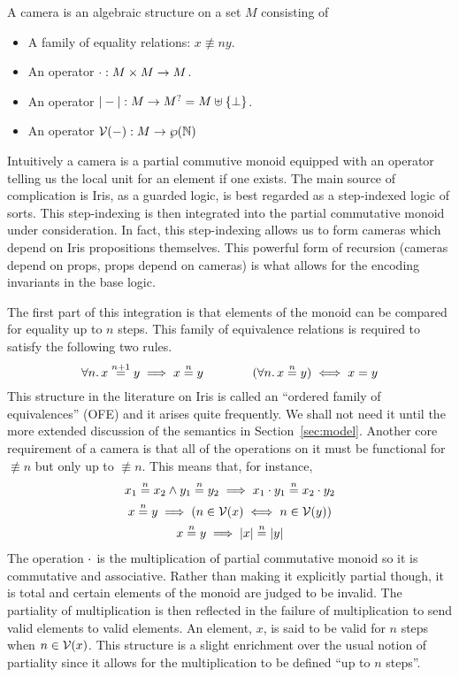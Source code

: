 \documentclass{amsart}
\begin{document}
A camera is an algebraic structure on a set $M$ consisting of
\begin{itemize}
\item A family of equality relations: $x \nequiv{n} y$.
\item An operator $\mathbin{\cdot} : M \times M \to M$.
\item An operator ${\mid}-{\mid} : M \to M^? = M \uplus \{\bot\}$.
\item An operator $\mathcal{V}(-) : M \to \wp(\mathbb{N})$
\end{itemize}
Intuitively a camera is a partial commutive monoid equipped with an
operator telling us the local unit for an element if one exists. The
main source of complication is Iris, as a guarded logic, is best
regarded as a step-indexed logic of sorts. This step-indexing is then
integrated into the partial commutative monoid under
consideration. In fact, this step-indexing allows us to form cameras
which depend on Iris propositions themselves. This powerful form of
recursion (cameras depend on props, props depend on cameras) is what
allows for the encoding invariants in the base logic.

The first part of this integration is that elements of the monoid can
be compared for equality up to $n$ steps. This family of equivalence
relations is required to satisfy the following two rules.
\[
  \All n. x \nequiv{n + 1} y \implies x \nequiv{n} y \qquad\qquad
  (\All n. x \nequiv{n} y) \iff x = y
\]
This structure in the literature on Iris is called an ``ordered family
of equivalences'' (OFE) and it arises quite frequently. We shall not
need it until the more extended discussion of the semantics in
Section~\ref{sec:model}. Another core requirement of a camera is that
all of the operations on it must be functional for $\nequiv{n}$ but
only up to $\nequiv{n}$. This means that, for instance,
\begin{gather*}
  x_1 \mathrel{\stackrel{n}{=}} x_2 \land y_1 \mathrel{\stackrel{n}{=}} y_2 \implies
  x_1 \mathbin{\cdot} y_1 \mathrel{\stackrel{n}{=}} x_2 \mathbin{\cdot} y_2\\
  x \mathrel{\stackrel{n}{=}} y \implies (n \in \mathcal{V}(x) \iff n \in \mathcal{V}(y))\\
  x \mathrel{\stackrel{n}{=}} y \implies {\mid}x{\mid} \mathrel{\stackrel{n}{=}} {\mid}y{\mid}
\end{gather*}
The operation $\mathbin{\cdot}$ is the multiplication of partial commutative
monoid so it is commutative and associative. Rather than making it
explicitly partial though, it is total and certain elements of the
monoid are judged to be invalid. The partiality of multiplication is
then reflected in the failure of multiplication to send valid elements
to valid elements. An element, $x$, is said to be valid for $n$ steps
when $n \in \mathcal{V}(x)$. This structure is a slight enrichment over the
usual notion of partiality since it allows for the multiplication to
be defined ``up to $n$ steps''.
\end{document}
